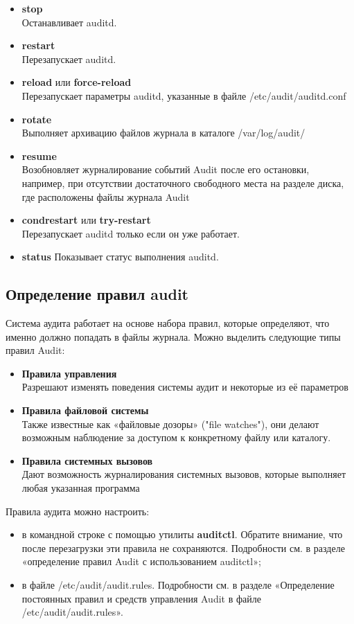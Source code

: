 \documentclass[a4paper,10pt,twoside]{article}
\begin{document}
\begin{itemize}
 \item \textbf{stop}\\
Останавливает auditd.
\item \textbf{restart}\\
Перезапускает auditd.
\item \textbf{reload} или \textbf{force-reload}\\
Перезапускает параметры auditd, указанные в файле /etc/audit/auditd.conf
\item \textbf{rotate}\\
Выполняет архивацию файлов журнала в каталоге /var/log/audit/ 
\item \textbf{resume}\\
Возобновляет журналирование событий Audit после его остановки, например, при отсутствии достаточного свободного места на разделе диска, где расположены файлы журнала Audit 
\item \textbf{condrestart} или \textbf{try-restart}\\
Перезапускает auditd только если он уже работает.
\item \textbf{status}
Показывает статус выполнения auditd.
\end{itemize}


\subsection{Определение правил audit}
Система аудита работает на основе набора правил, которые определяют, что именно должно попадать в файлы журнала. Можно выделить следующие типы правил Audit: 

\begin{itemize}
 \item \textbf{Правила управления}\\
Разрешают изменять поведения системы аудит и некоторые из её параметров
\item \textbf{Правила файловой системы}\\
Также известные как «файловые дозоры» ("file watches"), они делают возможным наблюдение за доступом к конкретному файлу или каталогу.
\item \textbf{Правила системных вызовов}\\
Дают возможность журналирования системных вызовов, которые выполняет любая указанная программа
\end{itemize}



Правила аудита можно настроить:
\begin{itemize}
 \item в командной строке с помощью утилиты \textbf{auditctl}. Обратите внимание, что после перезагрузки эти правила не сохраняются. Подробности см. в разделе «определение правил Audit с использованием auditctl»;
\item в файле /etc/audit/audit.rules. Подробности см. в разделе «Определение постоянных правил и средств управления Audit в файле /etc/audit/audit.rules».
\end{itemize}
\end{document}
